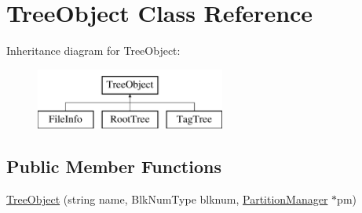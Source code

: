 \hypertarget{classTreeObject}{}\section{Tree\+Object Class Reference}
\label{classTreeObject}
Inheritance diagram for Tree\+Object\+:\begin{figure}[H]
\begin{center}
\leavevmode
\includegraphics[height=2.000000cm]{classTreeObject}
\end{center}
\end{figure}
\subsection*{Public Member Functions}
\begin{DoxyCompactItemize}
\item 
\hyperlink{classTreeObject_a1ef90156e6b45ddef28c59a89cd1097d}{Tree\+Object} (string name, Blk\+Num\+Type blknum, \hyperlink{classPartitionManager}{Partition\+Manager} $\ast$pm)
\end{DoxyCompactItemize}

